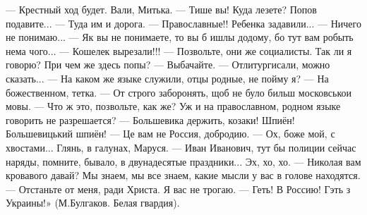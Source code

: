 \obeycr
— Крестный ход будет. Вали, Митька.
— Тише вы! Куда лезете? Попов подавите...
— Туда им и дорога.
— Православные!! Ребенка задавили...
— Ничего не понимаю...
— Як вы не понимаете, то вы б ишлы додому, бо тут вам робыть нема чого...
— Кошелек вырезали!!!
— Позвольте, они же социалисты. Так ли я говорю? При чем же здесь попы?
— Выбачайте.
— Отлитургисали, можно сказать...
— На каком же языке служили, отцы родные, не пойму я?
— На божественном, тетка.
— От строго заборонять, щоб не було бильш московськои мовы.
— Что ж это, позвольте, как же? Уж и на православном, родном языке говорить не разрешается?
— Большевика держить, козаки! Шпиён! Большевицький шпиён!
— Це вам не Россия, добродию.
— Ох, боже мой, с хвостами... Глянь, в галунах, Маруся.
— Иван Иванович, тут бы полиции сейчас наряды, помните, бывало, в двунадесятые праздники... Эх, хо, хо.
— Николая вам кровавого давай? Мы знаем, мы все знаем, какие мысли у вас в голове находятся.
— Отстаньте от меня, ради Христа. Я вас не трогаю.
— Геть! В Россию! Гэть з Украины!»
(М.Булгаков. Белая гвардия).
\restorecr
